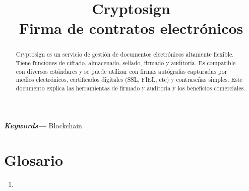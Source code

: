 \documentclass[letterpaper, 12pt]{article}
\title{Cryptosign\\
Firma de contratos electrónicos\\
}
\providecommand{\keywords}[1]{\textbf{\textit{Keywords---}} #1}
\begin{document}
\maketitle

\begin{abstract}
Cryptosign es un servicio de gestión de documentos electrónicos altamente flexible. Tiene funciones de cifrado, almacenado, sellado, firmado y auditoría. Es compatible con diversos estándares y se puede utilizar con firmas autógrafas capturadas por medios electrónicos, certificados digitales (SSL, FIEL, etc) y contraseñas simples. Este documento explica las herramientas de firmado y auditoría y los beneficios comerciales.
\end{abstract}

\setlength\parindent{.45in} \keywords{Blockchain}

\clearpage

\tableofcontents
\listoffigures

\section*{Glosario}
\begin{enumerate}
    \item 
\end{enumerate}


\clearpage


\end{document}
